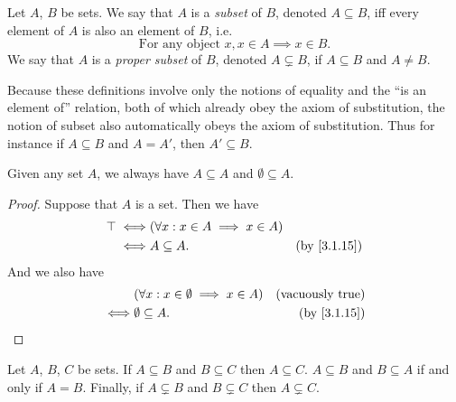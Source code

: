 \begin{definition}[Subsets]\label{3.1.15}
  Let \(A\), \(B\) be sets.
  We say that \(A\) is a \emph{subset} of \(B\), denoted \(A \subseteq B\), iff every element of \(A\) is also an element of \(B\), i.e.
  \[
    \text{For any object } x, x \in A \implies x \in B.
  \]
  We say that \(A\) is a \emph{proper subset} of \(B\), denoted \(A \subsetneq B\), if \(A \subseteq B\) and \(A \neq B\).
\end{definition}

\begin{remark}\label{3.1.16}
  Because these definitions involve only the notions of equality and the ``is an element of'' relation, both of which already obey the axiom of substitution, the notion of subset also automatically obeys the axiom of substitution.
  Thus for instance if \(A \subseteq B\) and \(A = A'\), then \(A' \subseteq B\).
\end{remark}

\begin{example}\label{3.1.17}
  Given any set \(A\), we always have \(A \subseteq A\) and \(\emptyset \subseteq A\).
\end{example}

\begin{proof}
  Suppose that \(A\) is a set.
  Then we have
  \begin{align*}
    \top \iff & (\forall x : x \in A \implies x \in A)                             \\
    \iff      & A \subseteq A.                         & \text{(by \cref{3.1.15})}
  \end{align*}
  And we also have
  \begin{align*}
         & (\forall x : x \in \emptyset \implies x \in A) & \text{(vacuously true)}   \\
    \iff & \emptyset \subseteq A.                         & \text{(by \cref{3.1.15})}
  \end{align*}
\end{proof}

\begin{proposition}\label{3.1.18}
  Let \(A\), \(B\), \(C\) be sets.
  If \(A \subseteq B\) and \(B \subseteq C\) then \(A \subseteq C\).
  \(A \subseteq B\) and \(B \subseteq A\) if and only if \(A = B\).
  Finally, if \(A \subsetneq B\) and \(B \subsetneq C\) then \(A \subsetneq C\).
\end{proposition}

